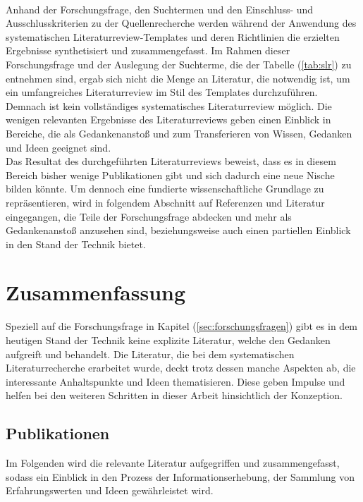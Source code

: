         \\
        Anhand der Forschungsfrage, den Suchtermen und den Einschluss- und Ausschlusskriterien zu der Quellenrecherche werden während der Anwendung
        des systematischen Literaturreview-Templates und deren Richtlinien die erzielten Ergebnisse synthetisiert und zusammengefasst. Im Rahmen 
        dieser Forschungsfrage und der Auslegung der Suchterme, die der Tabelle (\ref{tab:slr}) zu entnehmen sind, ergab sich nicht die Menge an Literatur, 
        die notwendig ist, um ein umfangreiches Literaturreview im Stil des Templates durchzuführen. Demnach ist kein vollständiges systematisches Literaturreview 
        möglich. Die wenigen relevanten Ergebnisse des Literaturreviews geben einen Einblick in Bereiche, die als Gedankenanstoß und zum Transferieren von 
        Wissen, Gedanken und Ideen geeignet sind. 
        \\
        \linebreak
        Das Resultat des durchgeführten Literaturreviews beweist, dass es in diesem Bereich bisher wenige Publikationen gibt und sich dadurch eine neue Nische bilden könnte. 
        Um dennoch eine fundierte wissenschaftliche Grundlage zu repräsentieren, wird in 
        folgendem Abschnitt auf Referenzen und Literatur eingegangen, die Teile der Forschungsfrage abdecken und mehr als Gedankenanstoß 
        anzusehen sind, beziehungsweise auch einen partiellen Einblick in den Stand der Technik bietet. 
\section{Zusammenfassung} 
    Speziell auf die Forschungsfrage in Kapitel (\ref{sec:forschungsfragen}) gibt es in dem heutigen Stand der Technik keine explizite 
    Literatur, welche den Gedanken aufgreift und behandelt. Die Literatur, die bei dem systematischen Literaturrecherche erarbeitet wurde, 
    deckt trotz dessen manche Aspekten ab, die interessante Anhaltspunkte und Ideen thematisieren. Diese geben Impulse und helfen bei den weiteren 
    Schritten in dieser Arbeit hinsichtlich der Konzeption. 
    
    \subsection{Publikationen}
    \label{subsec:publications}
        Im Folgenden wird die relevante Literatur aufgegriffen und zusammengefasst, sodass ein Einblick in den Prozess der 
        Informationserhebung, der Sammlung von Erfahrungswerten und Ideen gewährleistet wird.
        
